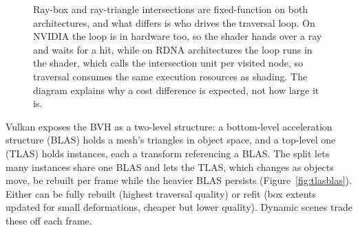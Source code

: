 \begin{figure}[tbp]
\centering
{}
\caption[Where the traversal loop lives]{Ray-box and ray-triangle intersections are fixed-function on
both architectures, and what differs is who drives the traversal loop. On NVIDIA the loop is in
hardware too, so the shader hands over a ray and waits for a hit, while on RDNA architectures the loop
runs in the shader, which calls the intersection unit per visited node, so traversal consumes the same
execution resources as shading. The diagram explains why a cost difference is expected, not how large
it is.}
\label{fig:traversal}
\end{figure}

Vulkan exposes the BVH as a two-level structure: a bottom-level acceleration structure
(BLAS) holds a mesh's triangles in object space, and a top-level one (TLAS) holds instances, each a
transform referencing a BLAS. The split lets many instances share one BLAS and lets the TLAS, which
changes as objects move, be rebuilt per frame while the heavier BLAS persists
(Figure~\ref{fig:tlasblas}). Either can be fully rebuilt (highest traversal quality) or refit (box
extents updated for small deformations, cheaper but lower quality). Dynamic scenes trade these off
each frame.

